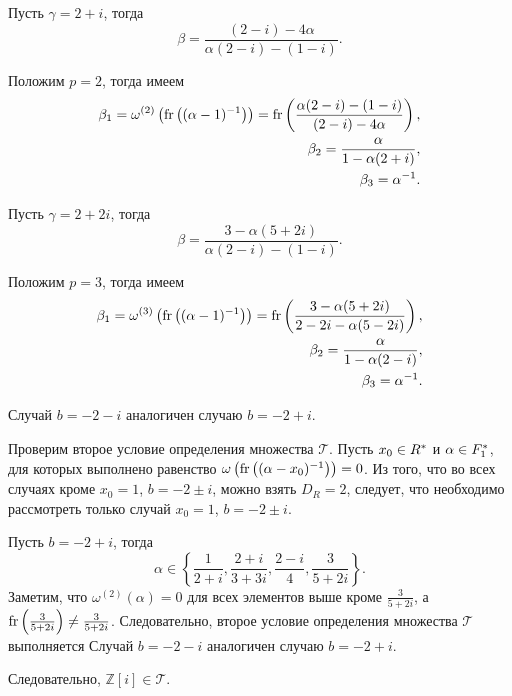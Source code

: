 \documentclass[_00_dissertation.tex]{subfiles}
\begin{document}
\begin{example}
    Пусть $\gamma = 2 + i$, тогда
    \begin{equation*}
        \beta = \frac{(2 - i) - 4\alpha}{\alpha(2 - i) - (1 - i)}.
    \end{equation*}

    Положим $p = 2$, тогда имеем
    \begin{equation*}
        \begin{split}
            \beta_1 = \omega^{(2)}\left(
                \textrm{fr}\left((\alpha-1)^{-1}\right)
            \right) = \textrm{fr}\left(\frac{\alpha(2 - i) - (1 - i)}{(2 - i) - 4\alpha}\right),\\
            \beta_2 = \frac{\alpha}{1 - \alpha(2 + i)},\\
            \beta_3 = \alpha^{-1}.
        \end{split}
    \end{equation*}

    Пусть $\gamma = 2 + 2i$, тогда
    \begin{equation*}
        \beta = \frac{3 - \alpha(5 + 2i)}{\alpha(2 - i) - (1 - i)}.
    \end{equation*}

    Положим $p = 3$, тогда имеем
    \begin{equation*}
        \begin{split}
            \beta_1 = \omega^{(3)}\left(
                \textrm{fr}\left((\alpha-1)^{-1}\right)
            \right) = \textrm{fr}\left(\frac{3 - \alpha(5 + 2i)}{2 - 2i - \alpha(5 - 2i)}\right),\\
            \beta_2 = \frac{\alpha}{1 - \alpha(2 - i)},\\
            \beta_3 = \alpha^{-1}.
        \end{split}
    \end{equation*}

    Случай $b = -2 - i$ аналогичен случаю $b = -2 + i$.

    Проверим второе условие определения множества $\mathcal{T}$.
    Пусть $x_0 \in R^{*}$ и $\alpha \in F_1^{*}$, для которых выполнено равенство $\omega\left(\textrm{fr}\left((\alpha - x_0)^{-1}\right)\right) = 0$.
    Из того, что во всех случаях кроме $x_0 = 1$, $b = -2 \pm i$, можно взять $D_R = 2$, следует, что необходимо рассмотреть только случай $x_0 = 1$, $b = -2 \pm i$.

    Пусть $b = -2 + i$, тогда
    \begin{equation*}
        \alpha \in \left\{
            \frac{1}{2 + i}, \frac{2 + i}{3 + 3i}, \frac{2 - i}{4}, \frac{3}{5 + 2i}
        \right\}.
    \end{equation*}
    Заметим, что $\omega^{(2)}(\alpha) = 0$ для всех элементов выше кроме $\frac{3}{5 + 2i}$, а $\textrm{fr}\left(\frac{3}{5 + 2i}\right) \neq \frac{3}{5 + 2i}$.
    Следовательно, второе условие определения множества $\mathcal{T}$ выполняется
    Случай $b = -2 - i$ аналогичен случаю $b = -2 + i$.

    Следовательно, $\mathbb{Z}[i] \in \mathcal{T}$.
\end{example}
\end{document}
